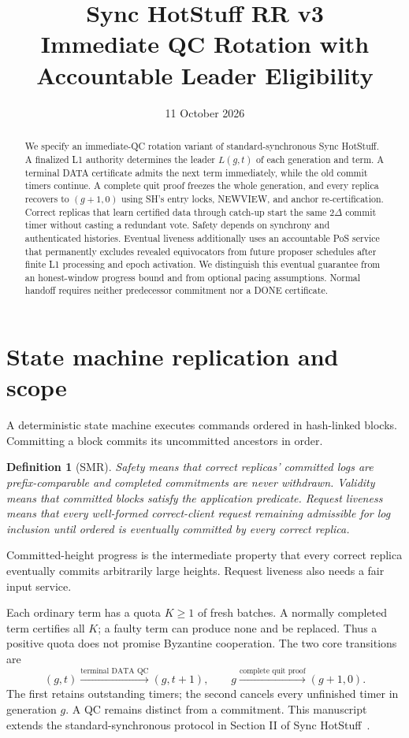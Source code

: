 \documentclass[11pt,a4paper]{article}
\title{Sync HotStuff RR v3\\\large Immediate QC Rotation with Accountable Leader Eligibility}
\author{}\date{11 October 2026}
\newtheorem{definition}{Definition}[section]
\newcounter{protocol}
\begin{document}
\maketitle
\begin{abstract}
We specify an immediate-QC rotation variant of standard-synchronous
Sync HotStuff. A finalized L1 authority determines the leader $L(g,t)$
of each generation and term. A terminal DATA certificate admits the next
term immediately, while the old commit timers continue. A complete quit
proof freezes the whole generation, and every replica recovers to
$(g+1,0)$ using SH's entry locks, NEWVIEW, and anchor re-certification.
Correct replicas that learn certified data through catch-up start the
same $2\Delta$ commit timer without casting a redundant vote. Safety
depends on synchrony and authenticated histories. Eventual liveness
additionally uses an accountable PoS service that permanently excludes
revealed equivocators from future proposer schedules after finite L1
processing and epoch activation. We distinguish this eventual guarantee
from an honest-window progress bound and from optional pacing assumptions.
Normal handoff requires neither predecessor commitment nor a DONE certificate.
\end{abstract}

\section{State machine replication and scope}
\label{sec:smr}
A deterministic state machine executes commands ordered in hash-linked
blocks. Committing a block commits its uncommitted ancestors in order.
\begin{definition}[SMR]
Safety means that correct replicas' committed logs are prefix-comparable
and completed commitments are never withdrawn. Validity means that
committed blocks satisfy the application predicate. Request liveness
means that every well-formed correct-client request remaining admissible
for log inclusion until ordered is eventually committed by every correct
replica.
\end{definition}
Committed-height progress is the intermediate property that every correct
replica eventually commits arbitrarily large heights. Request liveness
also needs a fair input service.

Each ordinary term has a quota $K\ge1$ of fresh batches. A normally
completed term certifies all $K$; a faulty term can produce none and be
replaced. Thus a positive quota does not promise Byzantine cooperation.
The two core transitions are
\[
 (g,t)\xrightarrow{\text{terminal DATA QC}}(g,t+1),
 \qquad
 g\xrightarrow{\text{complete quit proof}}(g+1,0).
\]
The first retains outstanding timers; the second cancels every unfinished
timer in generation $g$. A QC remains distinct from a commitment.
This manuscript extends the standard-synchronous protocol in
Section II of Sync HotStuff~\cite{sync}.
\end{document}
